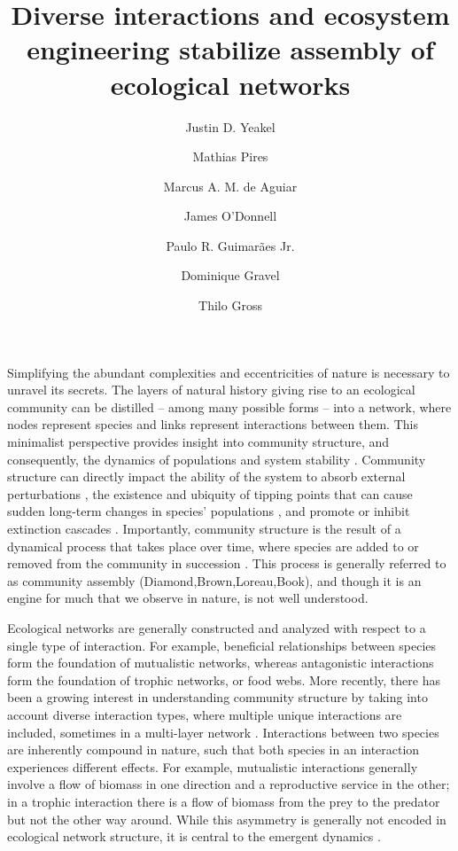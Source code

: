 \documentclass[9pt,twocolumn,twoside]{pnas-new}
\title{Diverse interactions and ecosystem engineering stabilize assembly of ecological networks}
\author[a,b]{Justin D. Yeakel}
\author[c]{Mathias Pires}
\author[c]{Marcus A. M. de Aguiar}
\author[d]{James O'Donnell}
\author[e]{Paulo R. Guimar\~aes Jr.}
\author[f]{Dominique Gravel}
\author[g]{Thilo Gross}
\affil[a]{School of Natural Sciences, University of California Merced, Merced, CA 95343, USA}
\affil[b]{Santa Fe Institute}
\affil[c]{Universidade Estadual de Campinas}
\affil[d]{University of Washington}
\affil[e]{Universidade de S\~ao Paulo}
\affil[f]{Universit\`e de Sherbrooke}
\affil[g]{University of California Davis, Davis CA}
\begin{document}
\verticaladjustment{-2pt}

\maketitle
\thispagestyle{firststyle}


Simplifying the abundant complexities and eccentricities of nature is necessary to unravel its secrets.
The layers of natural history giving rise to an ecological community can be distilled -- among many possible forms -- into a network, where nodes represent species and links represent interactions between them.
This minimalist perspective provides insight into community structure, and consequently, the dynamics of populations and system stability \cite{May1972}.
Community structure can directly impact the ability of the system to absorb external perturbations \cite{Yeakel2014,Novak2016}, the existence and ubiquity of tipping points that can cause sudden long-term changes in species' populations \cite{Lade2011,Boettiger2012}, and promote or inhibit extinction cascades \cite{Stouffer2011}.
Importantly, community structure is the result of a dynamical process that takes place over time, where species are added to or removed from the community in succession \cite{Weiher2001}.
This process is generally referred to as community assembly (Diamond,Brown,Loreau,Book), and though it is an engine for much that we observe in nature, is not well understood.

Ecological networks are generally constructed and analyzed with respect to a single type of interaction.
For example, beneficial relationships between species form the foundation of mutualistic networks, whereas antagonistic interactions form the foundation of trophic networks, or food webs. %
More recently, there has been a growing interest in understanding community structure by taking into account diverse interaction types, where multiple unique interactions are included, sometimes in a multi-layer network \cite{Kefi2016,Pilosof2017}.
Interactions between two species are inherently compound in nature, such that both species in an interaction experiences different effects.
For example, mutualistic interactions generally involve a flow of biomass in one direction and a reproductive service in the other; in a trophic interaction there is a flow of biomass from the prey to the predator but not the other way around.
While this asymmetry is generally not encoded in ecological network structure, it is central to the emergent dynamics \cite{Gross2009,Allesina2012}.
\end{document}
